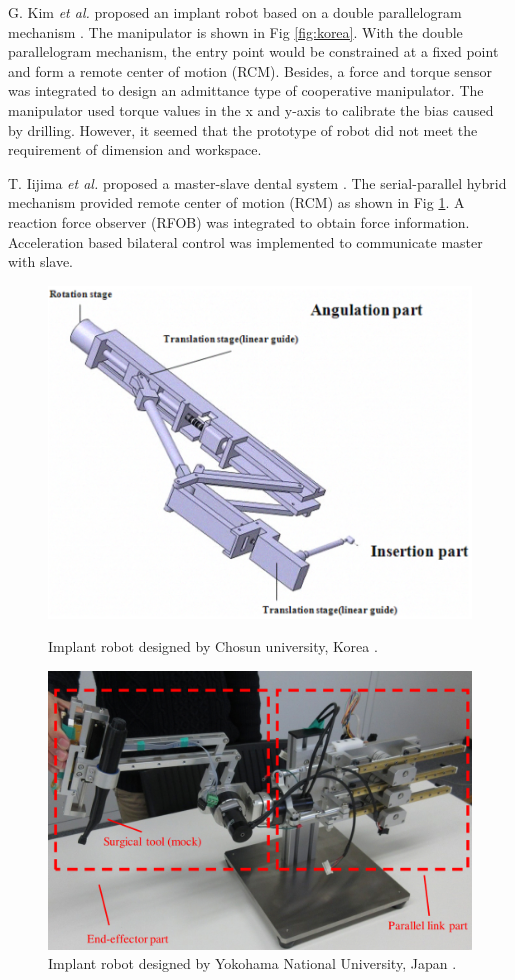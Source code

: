 \par
G. Kim \textit{et al.} proposed an implant robot based on a double parallelogram mechanism \cite{Kim2009ASO}. The manipulator is shown in Fig \ref{fig:korea}. With the double parallelogram mechanism, the entry point would be constrained at a fixed point and form a remote center of motion (RCM). Besides, a force and torque sensor was integrated to design an admittance type of cooperative manipulator. The manipulator used torque values in the x and y-axis to calibrate the bias caused by drilling. However, it seemed that the prototype of robot did not meet the requirement of dimension and workspace.
\par
T. Iijima \textit{et al.} proposed a master-slave dental system \cite{9026216}. The serial-parallel hybrid mechanism provided remote center of motion (RCM) as shown in Fig \ref{fig:japan}. A reaction force observer (RFOB) was integrated to obtain force information. Acceleration based bilateral control was implemented to communicate master with slave. 
\begin{figure}[htbp]
\begin{center}
\includegraphics[width=0.7\linewidth]{Images/korea.png}
\caption[Implant robot designed by Chosun university, Korea]{
Implant robot designed by Chosun university, Korea \cite{Kim2009ASO}.
}\label{fig:korea}

\includegraphics[width=0.7\linewidth]{Images/Japan.png}
\caption[Implant robot designed by Yokohama National University, Japan]{
Implant robot designed by Yokohama National University, Japan \cite{9026216}.
}\label{fig:japan}
\end{center}
\end{figure}

